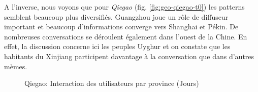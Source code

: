 A l{\textquoteright}inverse, nous voyons que pour \textit{Qiegao} (fig. \ref{fig:geo-qiegao-t0}) les
patterns semblent beaucoup plus diversifi\'es. Guangzhou joue un r\^ole
de diffuseur important et beaucoup d{\textquoteright}informations
converge vers Shanghai et P\'ekin. De nombreuses conversations se
d\'eroulent \'egalement dans l{\textquoteright}ouest de la Chine. En
effet, la discussion concerne ici les peuples Uyghur et on constate que
les habitants du Xinjiang participent davantage \`a la conversation que
dans d{\textquoteright}autres m\`emes. 

\begin{figure}[th]
    \centering
    \newline
    
  \caption{
    Qiegao: Interaction des utilisateurs par province (Jours)
  }
\end{figure}

